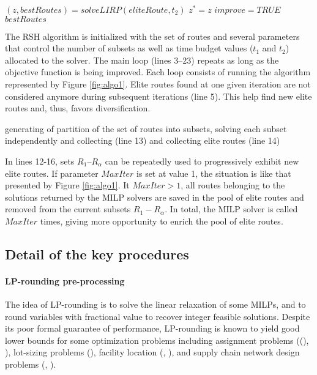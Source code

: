 \documentclass[a4paper,10pt]{article}
\begin{document}
\begin{linenumbers}
\begin{algorithm}
\begin{algorithmic}[1]
		\ENDFOR
		\ENDFOR
		\STATE 	$(z,bestRoutes) = solveLIRP(eliteRoute, t_2)$
		\STATE $z^*=z$
		\STATE $improve =TRUE$
		\ENDIF
		\RETURN $bestRoutes$
	\end{algorithmic}
\end{algorithm}


The RSH algorithm is initialized with the set of routes and several parameters that control the number of subsets as well as time budget values ($t_1$ and $t_2$) allocated to the solver. 
The main loop (lines 3--23) repeats as long as the objective function is being improved. 
Each loop consists of running the algorithm represented by Figure \ref{fig:algo1}. 
Elite routes found at one given iteration are not considered anymore during subsequent iterations (line 5). This help find new elite routes and, thus, favors diversification. 


 generating of partition of the set of routes into subsets, solving each subset independently and collecting  (line 13) and collecting elite routes (line 14)

In lines 12-16, sets $R_1$--$R_\alpha$ can be repeatedly used to progressively exhibit new elite routes. 
If parameter $MaxIter$ is set at value 1, the situation is like that presented by Figure \ref{fig:algo1}. 
It $MaxIter > 1$,  all routes belonging to the solutions returned by the MILP solvers are saved in the pool of elite routes and removed from the current subsets $R_1 - R_\alpha $. 
In total, the MILP solver is called $MaxIter$ times, giving more opportunity to enrich the pool of elite routes. 

\subsection{Detail of the key procedures} \label{sec:details}


\paragraph{LP-rounding pre-processing}

	The idea of LP-rounding is to solve the linear relaxation of some MILPs, 
	and to round variables with fractional value to recover integer feasible solutions. 
	Despite its poor formal guarantee of performance, LP-rounding is known to yield good lower bounds 
	for some optimization problems including assignment problems ((\cite{BvN82}), \cite{FW07}), 
	lot-sizing problems (\cite{HNS07}), facility location (\cite{LSS2012}, \cite{CPS06}), 
	and supply chain network design problems  (\cite{VMN06}, \cite{Thanh2010}).
	

\end{linenumbers}
\end{document}
